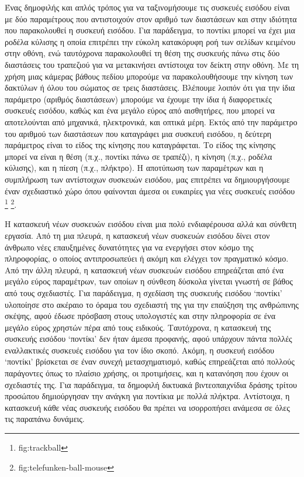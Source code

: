 \documentclass[
]{article}
\begin{document}
Ένας δημοφιλής και απλός τρόπος για να ταξινομήσουμε τις συσκευές
εισόδου είναι με δύο παραμέτρους που αντιστοιχούν στον αριθμό των
διαστάσεων και στην ιδιότητα που παρακολουθεί η συσκευή εισόδου. Για
παράδειγμα, το ποντίκι μπορεί να έχει μια ροδέλα κύλισης η οποία
επιτρέπει την εύκολη κατακόρυφη ροή των σελίδων κειμένου στην οθόνη, ενώ
ταυτόχρονα παρακολουθεί τη θέση της συσκευής πάνω στις δύο διαστάσεις
του τραπεζιού για να μετακινήσει αντίστοιχα τον δείκτη στην οθόνη. Με τη
χρήση μιας κάμερας βάθους πεδίου μπορούμε να παρακολουθήσουμε την κίνηση
των δακτύλων ή όλου του σώματος σε τρεις διαστάσεις. Βλέπουμε λοιπόν ότι
για την ίδια παράμετρο (αριθμός διαστάσεων) μπορούμε να έχουμε την ίδια
ή διαφορετικές συσκευές εισόδου, καθώς και ένα μεγάλο εύρος από
αισθητήρες, που μπορεί να αποτελούνται από μηχανικά, ηλεκτρονικά, και
οπτικά μέρη. Εκτός από την παράμετρο του αριθμού των διαστάσεων που
καταγράφει μια συσκευή εισόδου, η δεύτερη παράμετρος είναι το είδος της
κίνησης που καταγράφεται. Το είδος της κίνησης μπορεί να είναι η θέση
(π.χ., ποντίκι πάνω σε τραπέζι), η κίνηση (π.χ., ροδέλα κύλισης), και η
πίεση (π.χ., πλήκτρο). Η αποτύπωση των παραμέτρων και η συμπλήρωση των
αντίστοιχων συσκευών εισόδου, μας επιτρέπει να δημιουργήσουμε έναν
σχεδιαστικό χώρο όπου φαίνονται άμεσα οι ευκαιρίες για νέες συσκευές
εισόδου \footnote{fig:trackball} \footnote{fig:telefunken-ball-mouse}.

Η κατασκευή νέων συσκευών εισόδου είναι μια πολύ ενδιαφέρουσα αλλά και
σύνθετη εργασία. Από τη μια πλευρά, η κατασκευή νέων συσκευών εισόδου
δίνει στον άνθρωπο νέες επαυξημένες δυνατότητες για να ενεργήσει στον
κόσμο της πληροφορίας, ο οποίος αντιπροσωπεύει ή ακόμη και ελέγχει τον
πραγματικό κόσμο. Από την άλλη πλευρά, η κατασκευή νέων συσκευών εισόδου
επηρεάζεται από ένα μεγάλο εύρος παραμέτρων, των οποίων η σύνθεση
δύσκολα γίνεται γνωστή σε βάθος από τους σχεδιαστές. Για παράδειγμα, η
σχεδίαση της συσκευής εισόδου `ποντίκι' υλοποίησε στο ακέραιο το όραμα
του σχεδιαστή της για την επαύξηση της ανθρώπινης σκέψης, αφού έδωσε
πρόσβαση στους υπολογιστές και στην πληροφορία σε ένα μεγάλο εύρος
χρηστών πέρα από τους ειδικούς. Ταυτόχρονα, η κατασκευή της συσκευής
εισόδου `ποντίκι' δεν ήταν άμεσα προφανής, αφού υπάρχουν πάντα πολλές
εναλλακτικές συσκευές εισόδου για τον ίδιο σκοπό. Ακόμη, η συσκευή
εισόδου `ποντίκι' βρίσκεται σε έναν συνεχή μετασχηματισμό, καθώς
επηρεάζεται από πολλούς παράγοντες όπως το πλαίσιο χρήσης, οι
προτιμήσεις, και η κατανόηση που έχουν οι σχεδιαστές της. Για
παράδειγμα, τα δημοφιλή δικτυακά βιντεοπαιχνίδια δράσης τρίτου προσώπου
δημιούργησαν την ανάγκη για ποντίκια με πολλά πλήκτρα. Αντίστοιχα, η
κατασκευή κάθε νέας συσκευής εισόδου θα πρέπει να ισορροπήσει ανάμεσα σε
όλες τις παραπάνω δυνάμεις.
\end{document}
